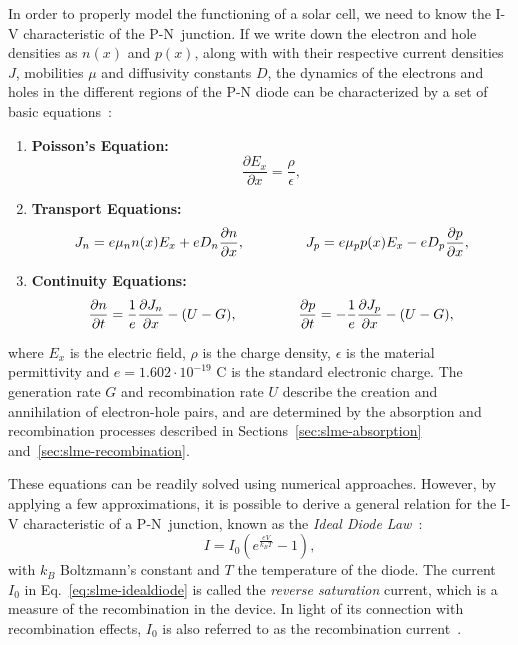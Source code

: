 \begin{refsection}
In order to properly model the functioning of a solar cell, we need to know the I-V characteristic of the P-N~junction. If we write down the electron and hole densities as $n(x)$ and $p(x)$, along with with their respective current densities $J$, mobilities $\mu$ and diffusivity constants $D$, the dynamics of the electrons and holes in the different regions of the P-N diode can be characterized by a set of basic equations~\cite{Shockley1949}:
\vspace{0.1in}
\begin{enumerate}
\item \textbf{Poisson's Equation: } \begin{equation}\frac{\partial E_x}{\partial x} = \frac{\rho}{\epsilon},\end{equation}

\item \textbf{Transport Equations: } \begin{equation}J_n = e \mu_n n(x) E_x + e D_n\frac{\partial n }{\partial x}, \hspace{0.6in} J_p = e \mu_p p(x) E_x - e D_p \frac{\partial p}{\partial x},\end{equation}

\item \textbf{Continuity Equations: } \begin{equation}\frac{\partial n}{\partial t} = \frac{1}{e} \frac{\partial J_n}{\partial x} - (U - G), \hspace{0.6in} \frac{\partial p}{\partial t} = - \frac{1}{e} \frac{\partial J_p}{\partial x} - (U - G),\end{equation}

\end{enumerate}
where $E_x$ is the electric field, $\rho$ is the charge density, $\epsilon$ is the material permittivity and $e = 1.602\cdot 10^{-19}$ C is the standard electronic charge. The generation rate $G$ and recombination rate $U$ describe the creation and annihilation of electron-hole pairs, and are determined by the absorption and recombination processes described in Sections~\ref{sec:slme-absorption} and~\ref{sec:slme-recombination}. 

These equations can be readily solved using numerical approaches. However, by applying a few approximations, it is possible to derive a general relation for the I-V characteristic of a P-N~junction, known as the \textit{Ideal Diode Law}~\cite{Shockley1949}:
\begin{equation}\label{eq:slme-idealdiode}
I = I_0 (e^\frac{e V}{k_B T} - 1),
\end{equation}
with $k_B$ Boltzmann's constant and $T$ the temperature of the diode. The current $I_0$ in Eq.~\ref{eq:slme-idealdiode} is called the \textit{reverse saturation} current, which is a measure of the recombination in the device. In light of its connection with recombination effects, $I_0$ is also referred to as the recombination current~\cite{Cuevas2014}.


\end{refsection}
